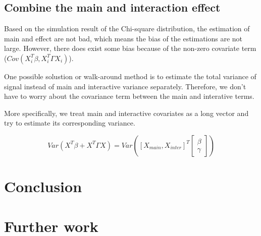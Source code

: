 \documentclass[]{article}
\begin{document}
\subsection{Combine the main and interaction
effect}\label{combine-the-main-and-interaction-effect}

Based on the simulation result of the Chi-square distribution, the
estimation of main and effect are not bad, which means the bias of the
estimations are not large. However, there does exist some bias because
of the non-zero covariate term (\(Cov(X_i^T\beta, X_i^T\Gamma X_i)\)).

One possible solustion or walk-around method is to estimate the total
variance of signal instead of main and interactive variance separately.
Therefore, we don't have to worry about the covariance term between the
main and interative terms.

More specifically, we treat main and interactive covariates as a long
vector and try to estimate its corresponding variance.

\[
  Var(X^T \beta + X^T\Gamma X) = Var \left( [X_{main}, X_{inter}]^T \begin{bmatrix}
    \beta \\
    \gamma
\end{bmatrix}\right)
\]

\section{Conclusion}\label{conclusion}

\section{Further work}\label{further-work}
\end{document}

